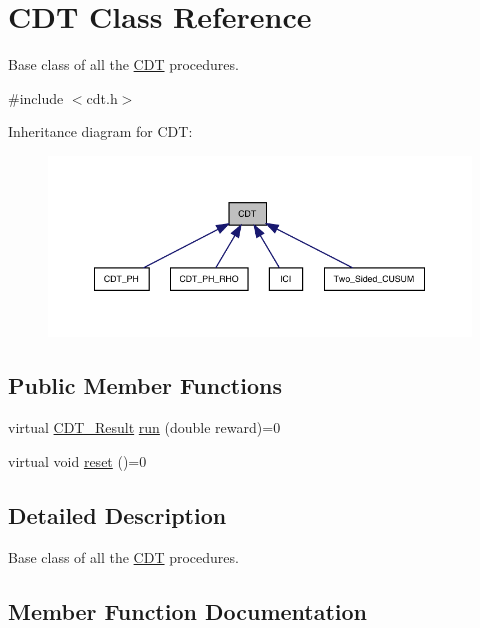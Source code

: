 \hypertarget{class_c_d_t}{}\section{C\+DT Class Reference}
\label{class_c_d_t}


Base class of all the \mbox{\hyperlink{class_c_d_t}{C\+DT}} procedures.  




{\ttfamily \#include $<$cdt.\+h$>$}



Inheritance diagram for C\+DT\+:
\nopagebreak
\begin{figure}[H]
\begin{center}
\leavevmode
\includegraphics[width=350pt]{class_c_d_t__inherit__graph}
\end{center}
\end{figure}
\subsection*{Public Member Functions}
\begin{DoxyCompactItemize}
\item 
virtual \mbox{\hyperlink{class_c_d_t___result}{C\+D\+T\+\_\+\+Result}} \mbox{\hyperlink{class_c_d_t_a2493aeb166403f448ec689d2f7b85dbc}{run}} (double reward)=0
\item 
virtual void \mbox{\hyperlink{class_c_d_t_a46446ec219a819466ff418d9ab7aa728}{reset}} ()=0
\end{DoxyCompactItemize}


\subsection{Detailed Description}
Base class of all the \mbox{\hyperlink{class_c_d_t}{C\+DT}} procedures. 

\subsection{Member Function Documentation}
\mbox{\label{class_c_d_t_a46446ec219a819466ff418d9ab7aa728}} 
